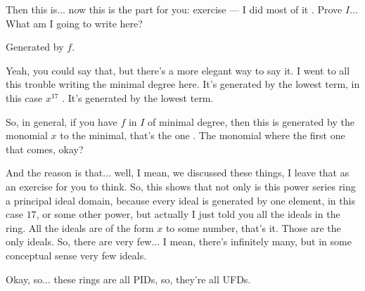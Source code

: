 \begin{speech}[00:05:31 - 00:05:45]
Then this is... now this is the part for you: exercise --- I did most of it . Prove $I$... What am I going to write here?
\end{speech}

\begin{student}
Generated by $f$.
\end{student}

\begin{speech}[00:05:47 - 00:06:53]
Yeah, you could say that, but there's a more elegant way to say it. I went to all this trouble writing the minimal degree here. It's generated by the lowest term, in this case $x^{17}$ . It's generated by the lowest term.

So, in general, if you have $f$ in $I$ of minimal degree, then this is generated by the monomial $x$ to the minimal, that's the one . The monomial where the first one that comes, okay?

And the reason is that... well, I mean, we discussed these things, I leave that as an exercise for you to think. So, this shows that not only is this power series ring a principal ideal domain, because every ideal is generated by one element, in this case $17$, or some other power, but actually I just told you all the ideals in the ring. All the ideals are of the form $x$ to some number, that's it. Those are the only ideals. So, there are very few... I mean, there's infinitely many, but in some conceptual sense very few ideals.

Okay, so... these rings are all PIDs, so, they're all UFDs.
\end{speech}

\begin{content}
\end{content}

